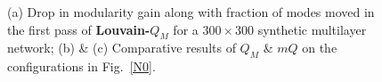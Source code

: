 \begin{figure}
\begin{center}
\end{center}
\vspace{-0.24in}
\caption{(a) Drop in modularity gain along with fraction of modes moved in the first pass of \textbf{Louvain-$Q_M$} for a $300\times300$
synthetic multilayer network; (b) \& (c) Comparative results
of $Q_M$ \& $mQ$ on the configurations in Fig.~\ref{N0}.}
\vspace{-0.22in}
\label{cross_multi_single}
\end{figure}


